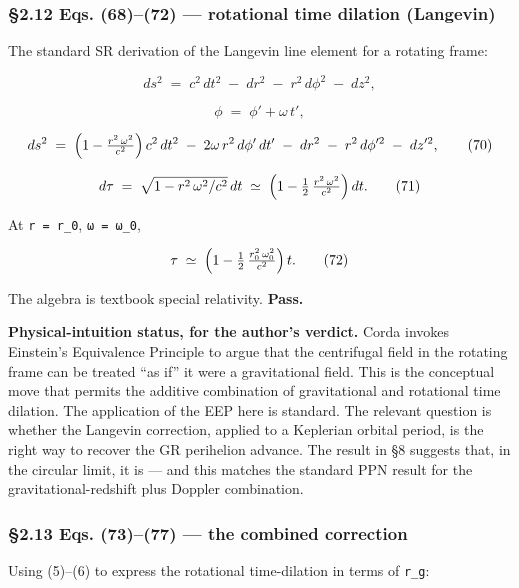 \documentclass[
  11pt,
]{article}
\begin{document}
\hypertarget{eqs.-6872-rotational-time-dilation-langevin}{%
\subsubsection{§2.12 Eqs. (68)--(72) --- rotational time dilation
(Langevin)}\label{eqs.-6872-rotational-time-dilation-langevin}}

The standard SR derivation of the Langevin line element for a rotating
frame:

\[
ds^{2} \;=\; c^{2}\,dt^{2} \;-\; dr^{2} \;-\; r^{2}\,d\phi^{2} \;-\; dz^{2}, \tag{68}
\]

\[
\phi \;=\; \phi' + \omega\,t', \tag{69}
\]

\[
ds^{2} \;=\; \Bigl(1 - \tfrac{r^{2}\,\omega^{2}}{c^{2}}\Bigr)\,c^{2}\,dt^{2}
\;-\; 2\omega\,r^{2}\,d\phi'\,dt'
\;-\; dr^{2} \;-\; r^{2}\,d\phi'^{2}
\;-\; dz'^{2}, \tag{70}
\]

\[
d\tau
\;=\; \sqrt{1 - r^{2}\,\omega^{2}/c^{2}}\,dt
\;\simeq\; \Bigl(1 - \tfrac{1}{2}\,\tfrac{r^{2}\,\omega^{2}}{c^{2}}\Bigr)\,dt. \tag{71}
\]

At \texttt{r\ =\ r\_0}, \texttt{ω\ =\ ω\_0},

\[
\tau
\;\simeq\; \Bigl(1 - \tfrac{1}{2}\,\tfrac{r_{0}^{2}\,\omega_{0}^{2}}{c^{2}}\Bigr)\,t. \tag{72}
\]

The algebra is textbook special relativity. \textbf{Pass.}

\textbf{Physical-intuition status, for the author's verdict.} Corda
invokes Einstein's Equivalence Principle to argue that the centrifugal
field in the rotating frame can be treated ``as if'' it were a
gravitational field. This is the conceptual move that permits the
additive combination of gravitational and rotational time dilation. The
application of the EEP here is standard. The relevant question is
whether the Langevin correction, applied to a Keplerian orbital period,
is the right way to recover the GR perihelion advance. The result in §8
suggests that, in the circular limit, it is --- and this matches the
standard PPN result for the gravitational-redshift plus Doppler
combination.

\hypertarget{eqs.-7377-the-combined-correction}{%
\subsubsection{§2.13 Eqs. (73)--(77) --- the combined
correction}\label{eqs.-7377-the-combined-correction}}

Using (5)--(6) to express the rotational time-dilation in terms of
\texttt{r\_g}:
\end{document}
